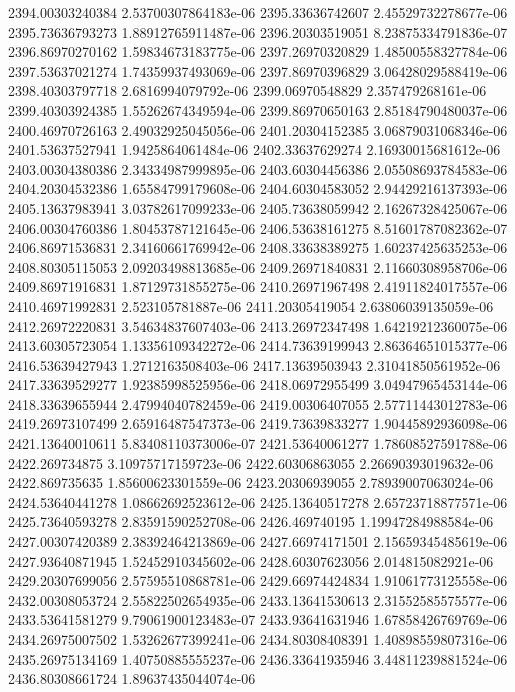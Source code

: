 {2394.00303240384 2.53700307864183e-06
2395.33636742607 2.45529732278677e-06
2395.73636793273 1.88912765911487e-06
2396.20303519051 8.23875334791836e-07
2396.86970270162 1.59834673183775e-06
2397.26970320829 1.48500558327784e-06
2397.53637021274 1.74359937493069e-06
2397.86970396829 3.06428029588419e-06
2398.40303797718 2.6816994079792e-06
2399.06970548829 2.357479268161e-06
2399.40303924385 1.55262674349594e-06
2399.86970650163 2.85184790480037e-06
2400.46970726163 2.49032925045056e-06
2401.20304152385 3.06879031068346e-06
2401.53637527941 1.9425864061484e-06
2402.33637629274 2.16930015681612e-06
2403.00304380386 2.34334987999895e-06
2403.60304456386 2.05508693784583e-06
2404.20304532386 1.65584799179608e-06
2404.60304583052 2.94429216137393e-06
2405.13637983941 3.03782617099233e-06
2405.73638059942 2.16267328425067e-06
2406.00304760386 1.80453787121645e-06
2406.53638161275 8.51601787082362e-07
2406.86971536831 2.34160661769942e-06
2408.33638389275 1.60237425635253e-06
2408.80305115053 2.09203498813685e-06
2409.26971840831 2.11660308958706e-06
2409.86971916831 1.87129731855275e-06
2410.26971967498 2.41911824017557e-06
2410.46971992831 2.523105781887e-06
2411.20305419054 2.63806039135059e-06
2412.26972220831 3.54634837607403e-06
2413.26972347498 1.64219212360075e-06
2413.60305723054 1.13356109342272e-06
2414.73639199943 2.86364651015377e-06
2416.53639427943 1.2712163508403e-06
2417.13639503943 2.31041850561952e-06
2417.33639529277 1.92385998525956e-06
2418.06972955499 3.04947965453144e-06
2418.33639655944 2.47994040782459e-06
2419.00306407055 2.57711443012783e-06
2419.26973107499 2.65916487547373e-06
2419.73639833277 1.90445892936098e-06
2421.13640010611 5.83408110373006e-07
2421.53640061277 1.78608527591788e-06
2422.269734875 3.10975717159723e-06
2422.60306863055 2.26690393019632e-06
2422.869735635 1.85600623301559e-06
2423.20306939055 2.78939007063024e-06
2424.53640441278 1.08662692523612e-06
2425.13640517278 2.65723718877571e-06
2425.73640593278 2.83591590252708e-06
2426.469740195 1.19947284988584e-06
2427.00307420389 2.38392464213869e-06
2427.66974171501 2.15659345485619e-06
2427.93640871945 1.52452910345602e-06
2428.60307623056 2.014815082921e-06
2429.20307699056 2.57595510868781e-06
2429.66974424834 1.91061773125558e-06
2432.00308053724 2.55822502654935e-06
2433.13641530613 2.31552585575577e-06
2433.53641581279 9.79061900123483e-07
2433.93641631946 1.67858426769769e-06
2434.26975007502 1.53262677399241e-06
2434.80308408391 1.40898559807316e-06
2435.26975134169 1.40750885555237e-06
2436.33641935946 3.44811239881524e-06
2436.80308661724 1.89637435044074e-06
}
